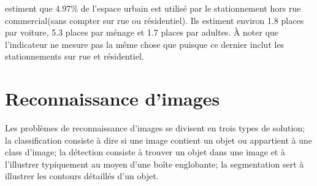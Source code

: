 \textcite{Davis:EstimatingParking:2010} estiment que 4.97\% de l'espace urbain est utilisé par le stationnement hors rue commercial(sans compter sur rue ou résidentiel). Ils estiment environ 1.8 places par voiture, 5.3 places par ménage et 1.7 places par adultes. À noter que l'indicateur ne mesure pas la même chose que \textcite{Chester:ParkingInfrastructure:2015} puisque ce dernier inclut les stationnements sur rue et résidentiel.

\section{Reconnaissance d'images}
Les problèmes de reconnaissance d'images se divisent en trois types de solution; la classification consiste à dire si une image contient un objet ou appartient à une class d'image; la détection consiste à trouver un objet dans une image et à l'illustrer typiquement au moyen d'une boîte englobante; la segmentation sert à illustrer les contours détaillés d'un objet.\par